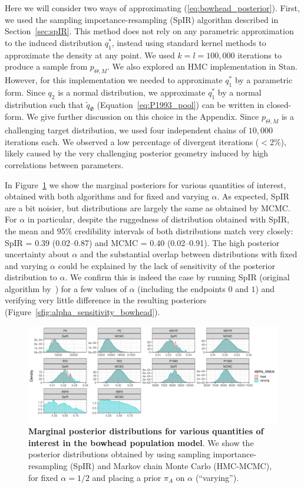 \documentclass[a4paper, notitlepage, 10pt]{article}
\begin{document}
Here we will consider two ways of approximating (\ref{eq:bowhead_posterior}).
First, we used the sampling importance-resampling (SpIR) algorithm described in Section~\ref{sec:spIR}.
This method does not rely on any parametric approximation to the induced distribution $q_1^\ast$, instead using standard kernel methods to approximate the density at any point.
We used $k = l = 100, 000$ iterations to produce a sample from $p_{\Theta, M}$.
We also explored an HMC implementation in Stan.
However, for this implementation we needed to approximate $q_1^\ast$ by a parametric form.
Since $q_2$ is a normal distribution, we approximate $q_1^\ast$ by a normal distribution such that $\tilde{q}_{\Phi}$ (Equation~\ref{eq:P1993_pool}) can be written in closed-form.
We give further discussion on this choice in the Appendix.
Since $p_{\Theta, M}$ is a challenging target distribution, we used four independent chains of  $10,000$ iterations each.
We observed a low percentage of divergent iterations ($<$2\%), likely caused by the very challenging posterior geometry induced by high correlations between parameters.

In Figure~\ref{fig:bowhead_marginal_posteriors} we show the marginal posteriors for various quantities of interest, obtained with both algorithms and for fixed and varying $\alpha$.
As expected, SpIR are a bit noisier, but distributions are largely the same as obtained by MCMC.
For $\alpha$ in particular, despite the ruggedness of distribution obtained with SpIR, the mean and 95\% credibility intervals of both distributions match very closely: SpIR = 0.39 (0.02--0.87) and MCMC = 0.40 (0.02--0.91).
The high posterior uncertainty about $\alpha$ and the substantial overlap between distributions with fixed and varying $\alpha$ could be explained by the lack of sensitivity of the posterior distribution to $\alpha$.
We confirm this is indeed the case by running SpIR (original algorithm by~\cite{Poole2000}) for a few values of $\alpha$ (including the endpoints $0$ and $1$) and verifying very little difference in the resulting posteriors (Figure~\ref{sfig:alpha_sensitivity_bowhead}). 
\begin{figure}[!ht]
\begin{center}
\includegraphics[scale=.45]{../plots/bowhead_posteriors.pdf}
\end{center}
\caption{\textbf{Marginal posterior distributions for various quantities of interest in the bowhead population model}.
We show the posterior distributions obtained by using sampling importance-resampling (SpIR) and Markov chain Monte Carlo (HMC-MCMC), for fixed $\alpha = 1/2$ and placing a prior $\pi_A$ on $\alpha$ (``varying'').
}
\label{fig:bowhead_marginal_posteriors}
\end{figure}
\end{document}

